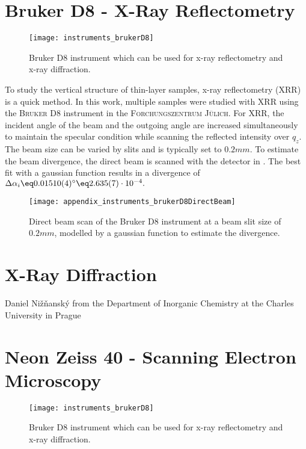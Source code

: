 \documentclass[\main/dresen_thesis.tex]{subfiles}
\begin{document}
\section{Bruker D8 - X-Ray Reflectometry}
\label{app:additionalExperimentalTechniques:xrr}
\begin{figure}[h]
  \centering
  \texttt{[image: instruments\_brukerD8]}
  \caption{\label{fig:appendix:instruments:brukerD8}Bruker D8 instrument which can be used for x-ray reflectometry and x-ray diffraction.}
\end{figure}
To study the vertical structure of thin-layer samples, x-ray reflectometry (XRR) is a quick method. In this work, multiple samples were studied with XRR using the \textsc{Bruker D8} instrument in the \textsc{Forchungszentrum J\"ulich}.
For XRR, the incident angle of the beam and the outgoing angle are increased simultaneously to maintain the specular condition while scanning the reflected intensity over $q_z$.
The beam size can be varied by slits and is typically set to $0.2 \unit{mm}$.
To estimate the beam divergence, the direct beam is scanned with the detector in .
The best fit with a gaussian function results in a divergence of $\Delta \alpha_i \eq 0.01510(4) ^\circ \eq 2.635(7) \cdot 10^{-4}.$
\begin{figure}[h]
  \centering
  \texttt{[image: appendix\_instruments\_brukerD8DirectBeam]}
  \caption{\label{fig:appendix:instruments:brukerD8DirectBeam}Direct beam scan of the Bruker D8 instrument at a beam slit size of $0.2 \unit{mm}$, modelled by a gaussian function to estimate the divergence.}
\end{figure}

\section{X-Ray Diffraction}
\label{app:additionalExperimentalTechniques:xrd}
Daniel Nižňanský from the Department of Inorganic Chemistry at the Charles University in Prague

\section{Neon Zeiss 40 - Scanning Electron Microscopy}
\label{app:additionalExperimentalTechniques:sem}
\begin{figure}[h]
  \centering
  \texttt{[image: instruments\_brukerD8]}
  \caption{\label{fig:appendix:instruments:SEM}Bruker D8 instrument which can be used for x-ray reflectometry and x-ray diffraction.}
\end{figure}
\end{document}
